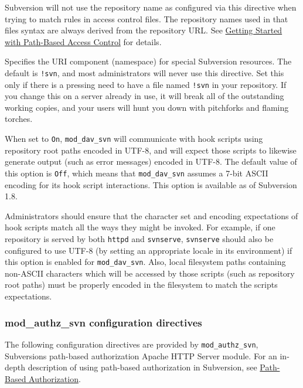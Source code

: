 \begin{description}
Subversion will not use the repository name as configured via this
directive when trying to match rules in access control files. The
repository names used in that file\textquotesingle s syntax are always
derived from the repository URL. See
\hyperref[svn.serverconfig.pathbasedauthz.getting-started]{Getting
Started with Path-Based Access Control} for details.
\item[\texttt{SVNSpecialURI\ component}]
Specifies the URI component (namespace) for special Subversion
resources. The default is \texttt{!svn}, and most administrators will
never use this directive. Set this only if there is a pressing need to
have a file named \texttt{!svn} in your repository. If you change this
on a server already in use, it will break all of the outstanding working
copies, and your users will hunt you down with pitchforks and flaming
torches.
\item[\texttt{SVNUseUTF8\ On\textbar{}Off}]
When set to \texttt{On}, \texttt{mod\_dav\_svn} will communicate with
hook scripts using repository root paths encoded in UTF-8, and will
expect those scripts to likewise generate output (such as error
messages) encoded in UTF-8. The default value of this option is
\texttt{Off}, which means that \texttt{mod\_dav\_svn} assumes a 7-bit
ASCII encoding for its hook script interactions. This option is
available as of Subversion 1.8.

Administrators should ensure that the character set and encoding
expectations of hook scripts match all the ways they might be invoked.
For example, if one repository is served by both \texttt{httpd} and
\texttt{svnserve}, \texttt{svnserve} should also be configured to use
UTF-8 (by setting an appropriate locale in its environment) if this
option is enabled for \texttt{mod\_dav\_svn}. Also, local filesystem
paths containing non-ASCII characters which will be accessed by those
scripts (such as repository root paths) must be properly encoded in the
filesystem to match the scripts\textquotesingle{} expectations.
\end{description}

\subsubsection{mod\_authz\_svn configuration
directives}\label{svn.serverconfig.httpd.ref.mod_authz_svn}

The following configuration directives are provided by
\texttt{mod\_authz\_svn}, Subversion\textquotesingle s path-based
authorization Apache HTTP Server module. For an in-depth description of
using path-based authorization in Subversion, see
\hyperref[svn.serverconfig.pathbasedauthz]{Path-Based Authorization}.


